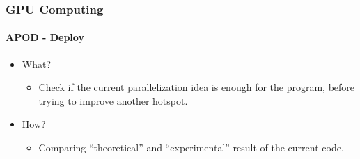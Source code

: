 \begin{frame}
    \frametitle{GPU Computing}
    \framesubtitle{APOD - Deploy}
    \begin{itemize}
        \item What?
        \begin{itemize}
            \item Check if the current parallelization idea is enough for the program,
              before trying to improve another hotspot.
        \end{itemize}
        \item How?
        \begin{itemize}
            \item Comparing ``theoretical'' and ``experimental'' result of the current code.
        \end{itemize}
    \end{itemize}
\end{frame}
